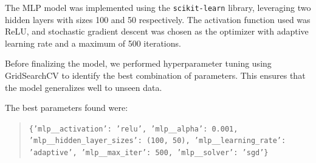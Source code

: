 The MLP model was implemented using the \texttt{scikit-learn} library, leveraging two hidden layers with sizes 100 and 50 respectively. The activation function used was ReLU, and stochastic gradient descent was chosen as the optimizer with adaptive learning rate and a maximum of 500 iterations.

Before finalizing the model, we performed hyperparameter tuning using GridSearchCV to identify the best combination of parameters. This ensures that the model generalizes well to unseen data.

\noindent
The best parameters found were:
\begin{quote}
\texttt{\{'mlp\_\_activation': 'relu', 'mlp\_\_alpha': 0.001, 'mlp\_\_hidden\_layer\_sizes': (100, 50), 'mlp\_\_learning\_rate': 'adaptive', 'mlp\_\_max\_iter': 500, 'mlp\_\_solver': 'sgd'\}}
\end{quote}

